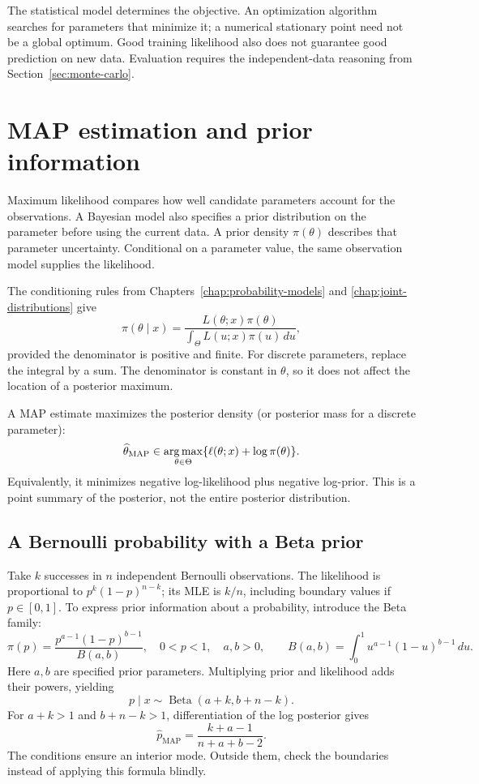 The statistical model determines the objective. An optimization algorithm
searches for parameters that minimize it; a numerical stationary point need
not be a global optimum. Good training likelihood also does not guarantee
good prediction on new data. Evaluation requires the independent-data
reasoning from Section~\ref{sec:monte-carlo}.

\section{MAP estimation and prior information}
\label{sec:map-estimation}

Maximum likelihood compares how well candidate parameters account for the
observations. A Bayesian model also specifies a prior distribution on the
parameter before using the current data. A prior density \(\pi(\theta)\)
describes that parameter uncertainty. Conditional on a parameter value,
the same observation model supplies the likelihood.

The conditioning rules from Chapters~\ref{chap:probability-models} and
\ref{chap:joint-distributions} give
\[
  \pi(\theta\mid x)
  =\frac{L(\theta;x)\pi(\theta)}
         {\int_\Theta L(u;x)\pi(u)\,du},
\]
provided the denominator is positive and finite. For discrete parameters,
replace the integral by a sum. The denominator is constant in \(\theta\),
so it does not affect the location of a posterior maximum.

\begin{definition}
A MAP estimate maximizes the posterior density (or posterior mass for
a discrete parameter):
\[
  \widehat\theta_{\mathrm{MAP}}\in
  \operatorname*{arg\,max}_{\theta\in\Theta}\{\ell(\theta;x)+\log\pi(\theta)\}.
\]
Equivalently, it minimizes negative log-likelihood plus negative log-prior.
This is a point summary of the posterior, not the entire posterior distribution.
\end{definition}

\subsection{A Bernoulli probability with a Beta prior}

Take \(k\) successes in \(n\) independent Bernoulli observations.
The likelihood is proportional to \(p^k(1-p)^{n-k}\); its MLE is
\(k/n\), including boundary values if \(p\in[0,1]\).
To express prior information about a probability, introduce the Beta family:
\[
  \pi(p)=\frac{p^{a-1}(1-p)^{b-1}}{B(a,b)},\quad 0<p<1,\quad a,b>0,
  \qquad B(a,b)=\int_0^1u^{a-1}(1-u)^{b-1}\,du.
\]
Here \(a,b\) are specified prior parameters. Multiplying prior and likelihood
adds their powers, yielding
\[
  p\mid x\sim\operatorname{Beta}(a+k,b+n-k).
\]
For \(a+k>1\) and \(b+n-k>1\), differentiation of the log posterior gives
\begin{equation}
  \widehat p_{\mathrm{MAP}}=\frac{k+a-1}{n+a+b-2}.
  \label{eq:beta-map}
\end{equation}
The conditions ensure an interior mode. Outside them, check the boundaries
instead of applying this formula blindly.

